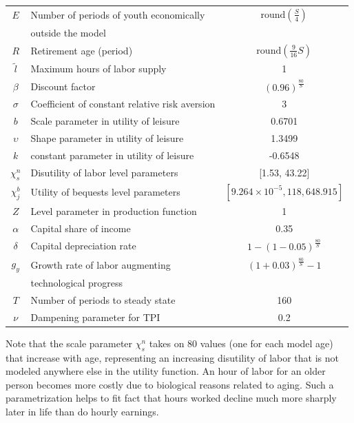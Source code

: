 \documentclass[letterpaper,12pt]{article}
\theoremstyle{definition}
\begin{document}
\begin{spacing}{1.5}
\begin{table}[htbp]
\begin{threeparttable}
\begin{tabular}{>{\footnotesize}c |>{\footnotesize}l |>{\footnotesize}c}
        $E$ & Number of periods of youth economically & $\text{round}\left(\frac{S}{4}\right)$ \\[-2mm]
        & \quad outside the model & \\
        $R$ & Retirement age (period) & $\text{round}\left(\frac{9}{16}S\right)$ \\
        \hline
        $\tilde{l}$ & Maximum hours of labor supply & 1 \\
        $\beta$ & Discount factor & $(0.96)^\frac{80}{S}$ \\
        $\sigma$ & Coefficient of constant relative risk aversion & 3 \\
        $b$ & Scale parameter in utility of leisure & 0.6701 \\
        $\upsilon$ & Shape parameter in utility of leisure & 1.3499 \\
        $k$ & constant parameter in utility of leisure & -0.6548 \\
        $\chi^n_s$ & Disutility of labor level parameters & [1.53, 43.22] \\
        $\chi^b_j$ & Utility of bequests level parameters &  $[9.264 \times 10^{-5}, 118,648.915]$ \\
        \hline
        $Z$ & Level parameter in production function & 1 \\
        $\alpha$ & Capital share of income & 0.35 \\
        $\delta$ & Capital depreciation rate & $1-(1-0.05)^\frac{80}{S}$ \\
        $g_y$ & Growth rate of labor augmenting & $(1+0.03)^\frac{80}{S}-1$ \\[-2mm]
        & \quad technological progress & \\
        \hline
        $T$ & Number of periods to steady state & 160 \\
        $\nu$ & Dampening parameter for TPI & 0.2 \\
        \hline\hline
      \end{tabular}
      \end{threeparttable}
    \end{table}

    Note that the scale parameter $\chi^n_s$ takes on 80 values (one for each model age) that increase with age, representing an increasing disutility of labor that is not modeled anywhere else in the utility function. An hour of labor for an older person becomes more costly due to biological reasons related to aging. Such a parametrization helps to fit fact that hours worked decline much more sharply later in life than do hourly earnings.


\end{spacing}
\end{document}
